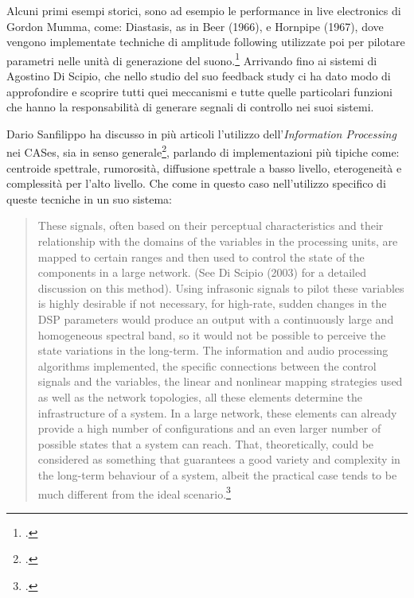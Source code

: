 Alcuni primi esempi storici,
sono ad esempio le performance in live electronics di Gordon Mumma, 
come: Diastasis, as in Beer (1966), e Hornpipe (1967), 
dove vengono implementate techniche di amplitude following utilizzate 
poi per pilotare parametri nelle unità di generazione del suono.\footcite{sanfilippo_time-domain_2021}
Arrivando fino ai sistemi di Agostino Di Scipio, che nello studio del suo
feedback study ci ha dato modo di approfondire e scoprire
tutti quei meccanismi e tutte quelle particolari funzioni che hanno la responsabilità
di generare segnali di controllo nei suoi sistemi. 

Dario Sanfilippo ha discusso in più articoli l'utilizzo dell'\textit{Information Processing} 
nei CASes, sia in senso generale\footcite{sanfilippo_time-domain_2021}, 
parlando di implementazioni più tipiche come: 
centroide spettrale, rumorosità, diffusione spettrale a basso livello, eterogeneità e
complessità per l'alto livello.
Che come in questo caso nell'utilizzo specifico di queste tecniche 
in un suo sistema:

\begin{quote}
    These signals, often based on
    their perceptual characteristics and their relationship with the domains of the variables
    in the processing units, are mapped to certain ranges and then used to control the state
    of the components in a large network. (See Di Scipio (2003) for a detailed discussion
    on this method). Using infrasonic signals to pilot these variables is highly desirable if
    not necessary, for high-rate, sudden changes in the DSP parameters would produce an
    output with a continuously large and homogeneous spectral band, so it would not be
    possible to perceive the state variations in the long-term.
    The information and audio processing algorithms implemented, the specific connections 
    between the control signals and the variables, the linear and nonlinear mapping strategies 
    used as well as the network topologies, all these elements determine the
    infrastructure of a system. In a large network, these elements can already provide a high
    number of configurations and an even larger number of possible states that a system
    can reach. That, theoretically, could be considered as something that guarantees a good
    variety and complexity in the long-term behaviour of a system, albeit the practical case
    tends to be much different from the ideal scenario.\footcite{sanfilippo_time-variant_2018}
\end{quote}

